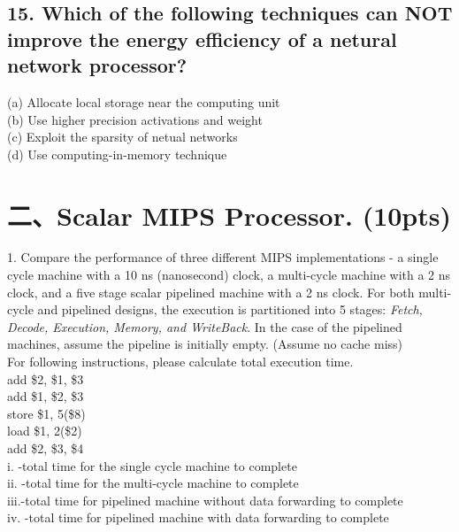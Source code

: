\documentclass[UTF8]{ctexart}
\begin{document}
\subsection*{15. Which of the following techniques can NOT improve the energy efficiency of a netural network processor?}
(a) Allocate local storage near the computing unit\\
(b) Use higher precision activations and weight\\
(c) Exploit the sparsity of netual networks\\
(d) Use computing-in-memory technique\\
\section{二、Scalar MIPS Processor. (10pts)}
1. Compare the performance of three different MIPS implementations - a single cycle machine with a 10 ns (nanosecond) clock, a multi-cycle machine with a 2 ns 
clock, and a five stage scalar pipelined machine with a 2 ns clock. For both multi-cycle and pipelined designs, the execution is partitioned into 5 stages: \textit{Fetch, 
Decode, Execution, Memory, and WriteBack}. In the case of the pipelined machines, assume the pipeline is initially empty. (Assume no cache miss)\\
For following instructions, please calculate total execution time.\\
add \$2, \$1, \$3\\
add \$1, \$2, \$3\\
store \$1, 5(\$8)\\
load \$1, 2(\$2)\\
add \$2, \$3, \$4\\
i. -total time for the single cycle machine to complete\\
ii. -total time for the multi-cycle machine to complete\\
iii.-total time for pipelined machine without data forwarding to complete\\
iv. -total time for pipelined machine with data forwarding to complete\\
\end{document}
